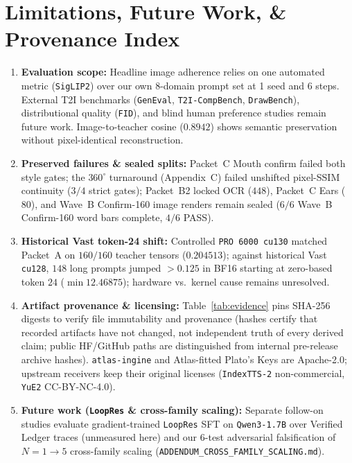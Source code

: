 \documentclass[10pt,twocolumn]{article}
\begin{document}
\section{Limitations, Future Work, \& Provenance Index}
\begin{enumerate}[leftmargin=1.2em,itemsep=1.5pt]
\item \textbf{Evaluation scope:} Headline image adherence relies on one automated metric (\texttt{SigLIP2}) over our own 8-domain prompt set at 1 seed and 6 steps. External T2I benchmarks (\texttt{GenEval}, \texttt{T2I-CompBench}, \texttt{DrawBench}), distributional quality (\texttt{FID}), and blind human preference studies remain future work. Image-to-teacher cosine ($0.8942$) shows semantic preservation without pixel-identical reconstruction.
\item \textbf{Preserved failures \& sealed splits:} Packet~C Mouth confirm failed both style gates; the $360^\circ$ turnaround (Appendix~C) failed unshifted pixel-SSIM continuity ($3/4$ strict gates); Packet~B2 locked OCR ($448$), Packet~C Ears ($80$), and Wave~B Confirm-160 image renders remain sealed ($6/6$ Wave~B Confirm-160 word bars complete, $4/6$ PASS).
\item \textbf{Historical Vast token-24 shift:} Controlled \texttt{PRO 6000 cu130} matched Packet~A on $160/160$ teacher tensors ($0.204513$); against historical Vast \texttt{cu128}, $148$ long prompts jumped $>0.125$ in BF16 starting at zero-based token $24$ ($\min 12.46875$); hardware vs.\ kernel cause remains unresolved.
\item \textbf{Artifact provenance \& licensing:} Table~\ref{tab:evidence} pins SHA-256 digests to verify file immutability and provenance (hashes certify that recorded artifacts have not changed, not independent truth of every derived claim; public HF/GitHub paths are distinguished from internal pre-release archive hashes). \texttt{atlas-ingine} and Atlas-fitted Plato's Keys are Apache-2.0; upstream receivers keep their original licenses (\texttt{IndexTTS-2} non-commercial, \texttt{YuE2} CC-BY-NC-4.0).
\item \textbf{Future work (\texttt{LoopRes} \& cross-family scaling):} Separate follow-on studies evaluate gradient-trained \texttt{LoopRes} SFT \cite{zhao2026loopres} on \texttt{Qwen3-1.7B} over Verified Ledger traces (unmeasured here) and our 6-test adversarial falsification of $N=1\to 5$ cross-family scaling (\texttt{ADDENDUM\_CROSS\_FAMILY\_SCALING.md}).
\end{enumerate}
\end{document}
